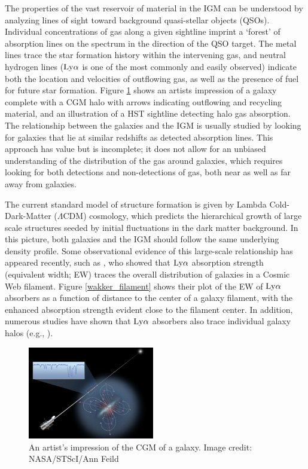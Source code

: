 \documentclass[twocolumn,tighten]{aastex62}
\begin{document}
The properties of the vast reservoir of material in the IGM can be understood by analyzing lines of sight toward background quasi-stellar objects (QSOs). Individual concentrations of gas along a given sightline imprint a `forest' of absorption lines on the spectrum in the direction of the QSO target. The metal lines trace the star formation history within the intervening gas, and neutral hydrogen lines ($\rm Ly\alpha$ is one of the most commonly and easily observed) indicate both the location and velocities of outflowing gas, as well as the presence of fuel for future star formation. Figure \ref{cgm_artist} shows an artists impression of a galaxy complete with a CGM halo with arrows indicating outflowing and recycling material, and an illustration of a HST sightline detecting halo gas absorption. The relationship between the galaxies and the IGM is usually studied by looking for galaxies that lie at similar redshifts as detected absorption lines. This approach has value but is incomplete; it does not allow for an unbiased understanding of the distribution of the gas around galaxies, which requires looking for both detections and non-detections of gas, both near as well as far away from galaxies.

The current standard model of structure formation is given by Lambda Cold-Dark-Matter ($\Lambda$CDM) cosmology, which predicts the hierarchical growth of large scale structures seeded by initial fluctuations in the dark matter background. In this picture, both galaxies and the IGM should follow the same underlying density profile. Some observational evidence of this large-scale relationship has appeared recently, such as \cite{wakker2015}, who showed that $\rm Ly\alpha$ absorption strength (equivalent width; EW) traces the overall distribution of galaxies in a Cosmic Web filament. Figure \ref{wakker_filament} shows their plot of the EW of $\rm Ly\alpha$ absorbers as a function of distance to the center of a galaxy filament, with the enhanced absorption strength evident close to the filament center. In addition, numerous studies have shown that $\rm Ly\alpha$ absorbers also trace individual galaxy halos (e.g., \citealt{lanzetta1995, chen1998, chen2001a,  tripp1998, bowen2002, cote2005, wakker2009, steidel2010, prochaska2011, thom2012, stocke2013, tumlinson2013, liang2014, danforth2016}). 


\begin{figure}[ht!]
        \centering
        \vspace{0pt}
        \includegraphics[width=0.49\textwidth]{hubble_cgm.jpg}
        \caption{\small{An artist's impression of the CGM of a galaxy. Image credit: NASA/STScI/Ann Feild}}
        \vspace{5pt}
        \label{cgm_artist}
\end{figure}
\end{document}

